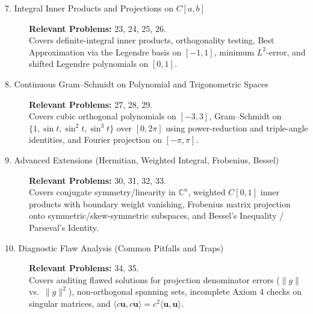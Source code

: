 \documentclass[11pt, letterpaper]{article}
\theoremstyle{definition}
\theoremstyle{remark}
\begin{document}
\begin{description}
    \item[{7. Integral Inner Products and Projections on {$C[a, b]$}}]
    \textbf{Relevant Problems:} 23, 24, 25, 26.\\
    Covers definite-integral inner products, orthogonality testing, Best Approximation via the Legendre basis on $[-1, 1]$, minimum $L^2$-error, and shifted Legendre polynomials on $[0, 1]$.

    \item[{8. Continuous Gram--Schmidt on Polynomial and Trigonometric Spaces}]
    \textbf{Relevant Problems:} 27, 28, 29.\\
    Covers cubic orthogonal polynomials on $[-3, 3]$, Gram--Schmidt on $\{1, \sin t, \sin^2 t, \sin^3 t\}$ over $[0, 2\pi]$ using power-reduction and triple-angle identities, and Fourier projection on $[-\pi, \pi]$.

    \item[{9. Advanced Extensions (Hermitian, Weighted Integral, Frobenius, Bessel)}]
    \textbf{Relevant Problems:} 30, 31, 32, 33.\\
    Covers conjugate symmetry/linearity in $\mathbb{C}^n$, weighted $C[0, 1]$ inner products with boundary weight vanishing, Frobenius matrix projection onto symmetric/skew-symmetric subspaces, and Bessel's Inequality / Parseval's Identity.

    \item[{10. Diagnostic Flaw Analysis (Common Pitfalls and Traps)}]
    \textbf{Relevant Problems:} 34, 35.\\
    Covers auditing flawed solutions for projection denominator errors ($\|g\|$ vs.\ $\|g\|^2$), non-orthogonal spanning sets, incomplete Axiom 4 checks on singular matrices, and $\langle c\mathbf{u}, c\mathbf{u} \rangle = c^2\langle \mathbf{u}, \mathbf{u} \rangle$.
\end{description}
\end{document}
